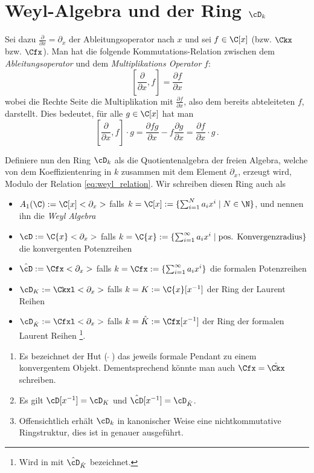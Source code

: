 \section{Weyl-Algebra und der Ring $\cD_k$}
Sei dazu $\frac{\partial}{\partial x}=\partial_x$ der Ableitungsoperator nach
$x$ und sei $f \in \C[x]$ (bzw. $\Ckx$ bzw. $\Cfx$).
Man hat die folgende
Kommutations-Relation zwischen dem \emph{Ableitungsoperator} und dem
\emph{Multiplikations Operator} $f$:
\begin{equation}\label{eq:weyl_relation}
[\frac{\partial}{\partial x},f]=\frac{\partial f}{\partial x}
\end{equation}
wobei die Rechte Seite die Multiplikation mit $\frac{\partial f}{\partial x}$,
also dem bereits abteleiteten $f$, darstellt. Dies bedeutet, für alle
$g\in\C[x]$ hat man
\[
[\frac{\partial}{\partial x},f]\cdot g
=\frac{\partial fg}{\partial x} - f\frac{\partial g}{\partial x}
=\frac{\partial f}{\partial x} \cdot g \,.
\]
\begin{defn}
Definiere nun den Ring $\cD_k$ als die Quotientenalgebra der freien Algebra,
welche von dem Koeffizientenring in $k$ zusammen mit dem Element $\partial_x$,
erzeugt wird, Modulo der Relation \eqref{eq:weyl_relation}.  Wir schreiben
diesen Ring auch als
\begin{itemize}
\item $A_1(\C):=\C[x]<\partial_x>$ falls $k=\C[x]:=\{ \sum^{N}_{i=1}a_ix^i \mid
  N\in \N \}$, und nennen ihn die \emph{Weyl Algebra}
\item $\cD:=\C\{x\}<\partial_x>$ falls $k=\C\{x\}:=\{ \sum^{\infty}_{i=1}a_ix^i
  \mid \mbox{pos.  Konvergenzradius}\}$ die konvergenten Potenzreihen
\item $\hat\cD:=\Cfx<\partial_x>$ falls $k=\Cfx:=\{\sum^{\infty}_{i=1}a_ix^i\}$
  die formalen Potenzreihen
\item $\cD_K:=\Ckxl<\partial_x>$ falls
$k=K:=\C\{x\}[x^{-1}]$ der Ring der Laurent Reihen
\item $\cD_{\hat K}:=\Cfxl<\partial_x>$ falls $k=\hat
K:=\Cfx[x^{-1}]$ der Ring der formalen Laurent Reihen
\footnote{Wird in \cite{ZulaBarbara} mit $\hat\cD_{\hat K}$ bezeichnet.}.
\end{itemize}
\end{defn}
\begin{bem}
\begin{enumerate}
\item Es bezeichnet der Hut ($ \, \hat \,\, $) das jeweils formale Pendant
zu einem konvergentem Objekt. Dementsprechend könnte man auch $\Cfx=\hat{\Ckx}$
schreiben.
\item Es gilt $\cD[x^{-1}]=\cD_K$ und $\hat \cD[x^{-1}]=\cD_{\hat K}$.
\item Offensichtlich erhält $\cD_k$ in kanonischer Weise eine nichtkommutative
Ringstruktur, dies ist in \cite[Kapittel 2 Section 1]{ZulaBarbara} genauer
ausgeführt.
\end{enumerate}
\end{bem}

